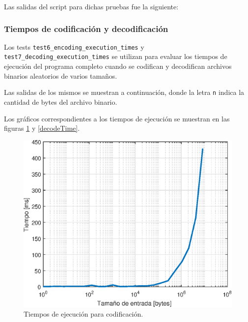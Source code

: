 Las salidas del script para dichas pruebas fue la siguiente:



\subsubsection{Tiempos de codificación y decodificación}

Los tests \texttt{test6\_encoding\_execution\_times} y \texttt{test7\_decoding\_execution\_times} se utilizan para evaluar los tiempos de ejecución del programa completo cuando se codifican y decodifican archivos binarios aleatorios de varios tamaños. 

Las salidas de los mismos se muestran a continuación, donde la letra \texttt{n} indica la cantidad de bytes del archivo binario.



Los gráficos correspondientes a los tiempos de ejecución se muestran en las figuras \ref{encodeTime} y \ref{decodeTime}.

\begin{figure}[h]
	\centering
	\includegraphics[scale=1]{includes/encodingTimes.eps}
	\caption{Tiempos de ejecución para codificación.}
	\label{encodeTime}
\end{figure}

